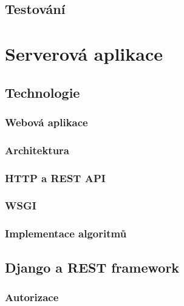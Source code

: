 \documentclass[a4paper,11pt,titlepage,fleqn]{article}
\begin{document}
    \subsection{Testování}


\newpage
\section{Serverová aplikace}
    
    \subsection{Technologie}
        \subsubsection{Webová aplikace}

        \subsubsection{Architektura}

        \subsubsection{HTTP a REST API}

        \subsubsection{WSGI}

        \subsubsection{Implementace algoritmů}

    \subsection{Django a REST framework}
        
        \subsubsection{Autorizace}
\end{document}
